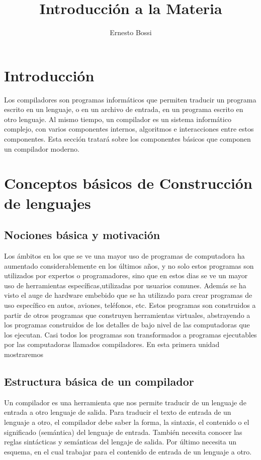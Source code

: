 \documentclass[fleqn]{tcdl}
\title{Introducción a la Materia}
\author[1]{Ernesto Bossi}
\affil[1]{Profesor}
\begin{document}
\flushbottom
\maketitle
\thispagestyle{empty}

\section*{Introducción}
\fontsize{11}{14}\selectfont

Los compiladores son programas informáticos que permiten traducir un programa escrito en un lenguaje, o en un archivo de entrada, en un programa escrito en otro lenguaje. Al mismo tiempo, un compilador es un sistema informático complejo, con varios componentes internos, algoritmos e interacciones entre estos componentes. Esta sección tratará sobre 
los componentes básicos que componen un compilador moderno.

\section*{Conceptos básicos de Construcción de lenguajes}

\subsection*{Nociones básica y motivación}

Los ámbitos en los que se ve una mayor uso de programas de computadora ha aumentado considerablemente en los últimos años, y no solo estos programas son utilizados por expertos o programadores, sino que en estos dias se ve un mayor uso de herramientas específicas,utilizadas por usuarios comunes. Además se ha visto el auge de hardware embebido que se ha utilizado para crear programas de uso específico en autos, aviones, teléfonos, etc. Estos programas son construidos a partir de otros programas que construyen herramientas virtuales, abstrayendo a los programas construidos de los detalles de bajo nivel de las computadoras que los ejecutan. Casi todos los programas son transformados a programas ejecutables por las computadoras llamados compiladores. En esta primera unidad mostraremos 

\subsection*{Estructura básica de un compilador}

Un compilador es una herramienta que nos permite traducir de un lenguaje de entrada a otro lenguaje de salida. Para traducir el texto de entrada de un lenguaje a otro, el compilador debe saber la forma, la sintaxis, el contenido o el significado (semántica) del lenguaje de entrada. También necesita conocer las reglas sintácticas y semánticas del lengaje de salida. Por último necesita un esquema, en el cual trabajar para el contenido de entrada de un lenguaje a otro.
\end{document}
